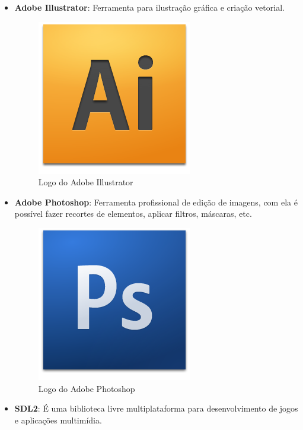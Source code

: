 \documentclass[11pt]{article} %
\begin{document}
\begin{itemize}
\item \textbf{Adobe Illustrator}: Ferramenta para ilustração gráfica e criação vetorial.

\begin{figure}[!htp]
\centering
\includegraphics[scale=0.3]{res/adobe_illustrator.png}
\caption{Logo do Adobe Illustrator}
\label{Adobe Illustrator}
\end{figure}

\item \textbf{Adobe Photoshop}: Ferramenta profissional de edição de imagens, com ela é possível fazer recortes de elementos, aplicar filtros, máscaras, etc.

\newpage

\begin{figure}[!htp]
\centering
\includegraphics[scale=0.3]{res/Photoshop.png}
\caption{Logo do Adobe Photoshop}
\label{Adobe Photoshop}
\end{figure}

\item \textbf{SDL2}: É uma biblioteca livre multiplataforma para desenvolvimento de jogos e aplicações multimídia.


\end{itemize}
\end{document}
